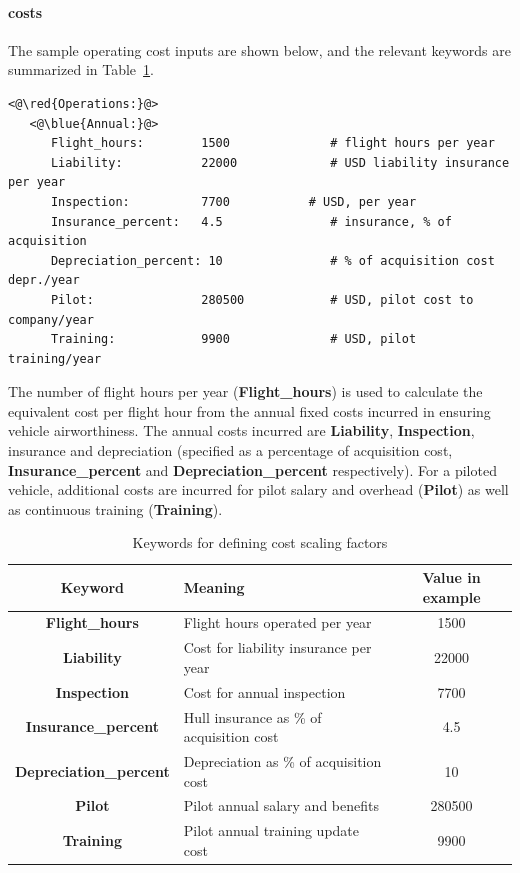 \paragraph{ costs}
The sample  operating cost inputs are shown below, and the relevant keywords are summarized in Table~\ref{tbl:annual_keywords}.
\begin{lstlisting}
<@\red{Operations:}@>
   <@\blue{Annual:}@>
      Flight_hours:        1500              # flight hours per year
      Liability:           22000             # USD liability insurance per year
      Inspection:          7700           # USD, per year
      Insurance_percent:   4.5               # insurance, % of acquisition 
      Depreciation_percent: 10               # % of acquisition cost depr./year
      Pilot:               280500            # USD, pilot cost to company/year
      Training:            9900              # USD, pilot training/year
\end{lstlisting}

The number of flight hours per year (\textbf{Flight\_hours}) is used to calculate the equivalent cost per flight hour from the annual fixed costs incurred in ensuring vehicle airworthiness. The annual costs incurred are \textbf{Liability}, \textbf{Inspection}, insurance and depreciation (specified as a percentage of acquisition cost, \textbf{Insurance\_percent} and \textbf{Depreciation\_percent} respectively). For a piloted vehicle, additional costs are incurred for pilot salary and overhead (\textbf{Pilot}) as well as continuous training (\textbf{Training}). 

\begin{table}[H]
\begin{center}
	\caption{Keywords for defining cost scaling factors}
	\label{tbl:annual_keywords}
    \begin{tabular}{| c | l | c |}
    \hline
    Keyword & Meaning & Value in example \\ 
    \hline
\textbf{Flight\_hours} & Flight hours operated per year & 1500 \\
\textbf{Liability} & Cost for liability insurance per year &  22000\\
\textbf{Inspection} & Cost for annual inspection &  7700\\
\textbf{Insurance\_percent} & Hull insurance as \% of acquisition cost &  4.5\\
\textbf{Depreciation\_percent} & Depreciation as \% of acquisition cost &  10\\
\textbf{Pilot} & Pilot annual salary and benefits &  280500\\
\textbf{Training} & Pilot annual training update cost &  9900\\
     \hline
  \end{tabular}
\end{center}
\end{table}
\vspace{-1cm}

